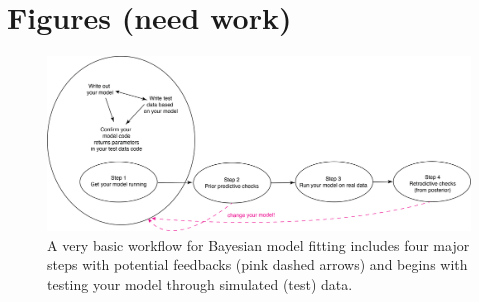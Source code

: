 \documentclass[11pt]{article}
\begin{document}
{\newpage
\section{Figures (need work)}

\begin{figure}[ht]
\centering
\noindent \includegraphics[width=1\textwidth]{figures/workflow.png}
\caption{A very basic workflow for Bayesian model fitting includes four major steps with potential feedbacks (pink dashed arrows) and begins with testing your model through simulated (test) data.}
\label{fig:workflow}
\end{figure}

}
\end{document}
